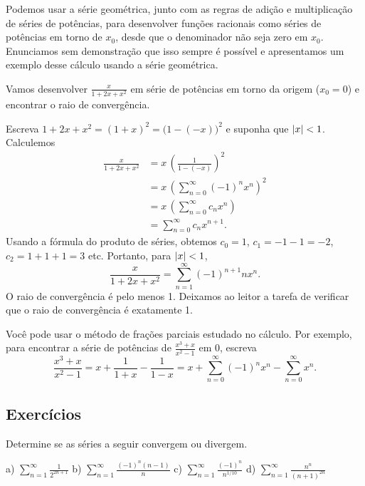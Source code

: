 Podemos usar a série geométrica, junto com as regras de adição e
multiplicação de séries de potências, para desenvolver funções racionais como séries de
potências em torno de $x_0$,
desde que o denominador não seja zero em $x_0$. Enunciamos sem
demonstração que isso sempre é possível e apresentamos um exemplo desse
cálculo usando a série geométrica.

\begin{example}
Vamos desenvolver $\frac{x}{1+2x+x^2}$ em série de potências em torno da origem ($x_0 = 0$) e
encontrar o raio de convergência.

Escreva $1+2x+x^2 = {(1+x)}^2 = {\bigl(1-(-x)\bigr)}^2$ e suponha
que $\lvert {x} \rvert < 1$. Calculemos
\begin{equation*}
\begin{split}
\frac{x}{1+2x+x^2}
&=
x \,
{\left(
\frac{1}{1-(-x)}
\right)}^2
\\
&=
x \,
{\left( 
\sum_{n=0}^\infty {(-1)}^n x^n 
\right)}^2
\\
&=
x \,
\left(
\sum_{n=0}^\infty c_n x^n 
\right)
\\
&=
\sum_{n=0}^\infty c_n x^{n+1} .
\end{split}
\end{equation*}
Usando a fórmula do produto de séries,
obtemos $c_0 = 1$, $c_1 = -1 -1 = -2$, $c_2 = 1+1+1 = 3$ etc.
Portanto, para $\lvert {x} \rvert < 1$, 
\begin{equation*}
\frac{x}{1+2x+x^2}
=
\sum_{n=1}^\infty {(-1)}^{n+1} n x^n .
\end{equation*}
O raio de convergência é pelo menos 1. Deixamos ao leitor a tarefa de
verificar que o raio de convergência é exatamente 1.
\end{example}

Você pode usar o método de frações parciais estudado no cálculo.
Por exemplo, para encontrar a série de potências de $\frac{x^3+x}{x^2-1}$ em 0, escreva
\begin{equation*}
\frac{x^3+x}{x^2-1}
=
x + \frac{1}{1+x} - \frac{1}{1-x}
=
x + \sum_{n=0}^\infty {(-1)}^n x^n - \sum_{n=0}^\infty x^n .
\end{equation*}

\subsection{Exercícios}

\begin{exercise}
Determine se as séries a seguir convergem ou divergem.

\medskip

\noindent
a)
$\displaystyle \sum_{n=1}^\infty \frac{1}{2^{2n+1}}$
\qquad
b)
$\displaystyle \sum_{n=1}^\infty \frac{{(-1)}^{n}(n-1)}{n}$
\qquad
c)
$\displaystyle \sum_{n=1}^\infty \frac{{(-1)}^n}{n^{1/10}}$
\qquad
d)
$\displaystyle \sum_{n=1}^\infty \frac{n^n}{{(n+1)}^{2n}}$
\end{exercise}

